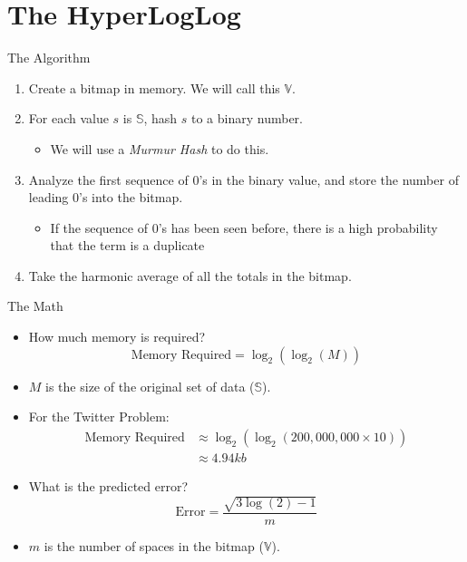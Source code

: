 \documentclass{beamer}
\begin{document}
\section{The HyperLogLog}
\begin{frame}{The Algorithm}
\begin{enumerate}
\item Create a bitmap in memory. We will call this $\mathbb{V}$.
\pause
\item For each value $s$ is $\mathbb{S}$, hash $s$ to a binary number.
\pause
\begin{itemize}
\item We will use a \textit{Murmur Hash} to do this.
\end{itemize}
\pause
\item Analyze the first sequence of 0's in the binary value, and store the number of leading 0's into the bitmap.
\begin{itemize}
\item If the sequence of 0's has been seen before, there is a high probability that the term is a duplicate
\end{itemize}
\pause
\item Take the harmonic average of all the totals in the bitmap.
\end{enumerate}
\end{frame}

\begin{frame}{The Math}
\begin{itemize}
\item How much memory is required?
\pause
\[
\text{Memory Required} = \log_{2}{(\log_{2}{(M)})}
\]
\pause
\item $M$ is the size of the original set of data ($\mathbb{S}$).
\pause
\item For the Twitter Problem:
\pause
\begin{align*}
\text{Memory Required} &\approx \log_{2}{(\log_{2}{(200,000,000 \times 10)})}\\
&\approx 4.94 kb
\end{align*}
\pause
\item What is the predicted error?
\pause
\[
\text{Error} = \frac{\sqrt{3\log{(2)} - 1}}{m}
\]
\pause
\item $m$ is the number of spaces in the bitmap ($\mathbb{V}$).
\end{itemize}
\end{frame}
\end{document}
